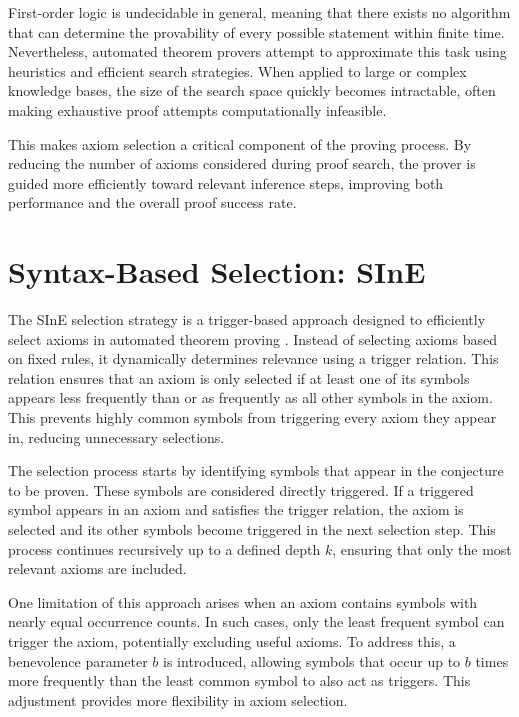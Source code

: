 \documentclass[english,version-2020-11]{uzl-thesis}
\begin{document}
First-order logic is undecidable in general, meaning that there exists no algorithm that can determine the provability of every possible statement within finite time. Nevertheless, automated theorem provers attempt to approximate this task using heuristics and efficient search strategies. When applied to large or complex knowledge bases, the size of the search space quickly becomes intractable, often making exhaustive proof attempts computationally infeasible.

This makes axiom selection a critical component of the proving process. By reducing the number of axioms considered during proof search, the prover is guided more efficiently toward relevant inference steps, improving both performance and the overall proof success rate.


\section{Syntax-Based Selection: SInE}

The SInE selection strategy is a trigger-based approach designed to efficiently select axioms in automated theorem proving \cite{Hoder2011}. Instead of selecting axioms based on fixed rules, it dynamically determines relevance using a trigger relation. This relation ensures that an axiom is only selected if at least one of its symbols appears less frequently than or as frequently as all other symbols in the axiom. This prevents highly common symbols from triggering every axiom they appear in, reducing unnecessary selections.

The selection process starts by identifying symbols that appear in the conjecture to be proven. These symbols are considered directly triggered. If a triggered symbol appears in an axiom and satisfies the trigger relation, the axiom is selected and its other symbols become triggered in the next selection step. This process continues recursively up to a defined depth \( k \), ensuring that only the most relevant axioms are included.

One limitation of this approach arises when an axiom contains symbols with nearly equal occurrence counts. In such cases, only the least frequent symbol can trigger the axiom, potentially excluding useful axioms. To address this, a benevolence parameter \( b \) is introduced, allowing symbols that occur up to \( b \) times more frequently than the least common symbol to also act as triggers. This adjustment provides more flexibility in axiom selection.
\end{document}
